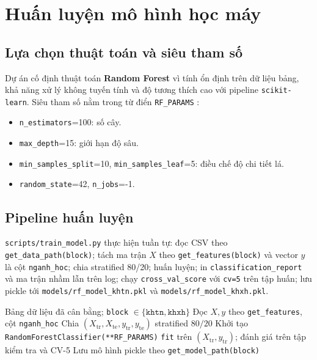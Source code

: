 \chapter{Huấn luyện mô hình học máy}

\section{Lựa chọn thuật toán và siêu tham số}
Dự án cố định thuật toán \textbf{Random Forest} vì tính ổn định trên dữ liệu bảng, khả năng xử lý không tuyến tính và độ tương thích cao với pipeline \texttt{scikit-learn}. Siêu tham số nằm trong từ điển \texttt{RF\_PARAMS} :
\begin{itemize}[leftmargin=*]
  \item \texttt{n\_estimators}=100: số cây.
  \item \texttt{max\_depth}=15: giới hạn độ sâu.
  \item \texttt{min\_samples\_split}=10, \texttt{min\_samples\_leaf}=5: điều chế độ chi tiết lá.
  \item \texttt{random\_state}=42, \texttt{n\_jobs}=-1.
\end{itemize}

\section{Pipeline huấn luyện}
\texttt{scripts/train\_model.py} thực hiện tuần tự: đọc CSV theo \texttt{get\_data\_path(block)}; tách ma trận $X$ theo \texttt{get\_features(block)} và vector $y$ là cột \texttt{nganh\_hoc}; chia stratified 80/20; huấn luyện; in \texttt{classification\_report} và ma trận nhầm lẫn trên log; chạy \texttt{cross\_val\_score} với \texttt{cv=5} trên tập huấn; lưu pickle tới \texttt{models/rf\_model\_khtn.pkl} và \texttt{models/rf\_model\_khxh.pkl}.

\begin{algorithm}[!htbp]
\caption{Huấn luyện Random Forest theo khối (mức logic)}
\label{alg:trainrf}
\begin{algorithmic}[1]
\Require Bảng dữ liệu đã cân bằng; \texttt{block} $\in\{\texttt{khtn},\texttt{khxh}\}$
\State Đọc $X,y$ theo \texttt{get\_features}, cột \texttt{nganh\_hoc}
\State Chia $(X_{\mathrm{tr}},X_{\mathrm{te}},y_{\mathrm{tr}},y_{\mathrm{te}})$ stratified $80/20$
\State Khởi tạo \texttt{RandomForestClassifier(**RF\_PARAMS)}
\State \texttt{fit} trên $(X_{\mathrm{tr}},y_{\mathrm{tr}})$; đánh giá trên tập kiểm tra và CV-5
\State Lưu mô hình pickle theo \texttt{get\_model\_path(block)}
\end{algorithmic}
\end{algorithm}
\FloatBarrier

